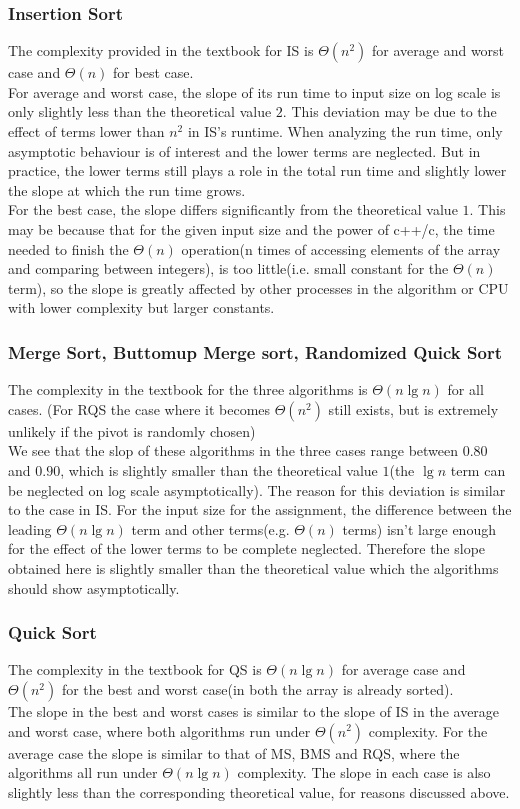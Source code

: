\documentclass[11pt]{article}
\theoremstyle{definition}
\begin{document}
\subsubsection*{Insertion Sort}
The complexity provided in the textbook for IS is $\Theta(n^2)$ for average and worst case and $\Theta(n)$ for best case. \\ 
For average and worst case, the slope of its run time to input size on log scale is only slightly less than the theoretical value $2$. This deviation may be due to the effect of terms lower than $n^2$ in IS's runtime. When analyzing the run time, only asymptotic behaviour is of interest and the lower terms are neglected. But in practice, the lower terms still plays a role in the total run time and slightly lower the slope at which the run time grows. \\ 
For the best case, the slope differs significantly from the theoretical value $1$. This may be because that for the given input size and the power of c++/c, the time needed to finish the $\Theta(n)$ operation(n times of accessing elements of the array and comparing between integers), is too little(i.e. small constant for the $\Theta(n)$ term), so the slope is greatly affected by other processes in the algorithm or CPU with lower complexity but larger constants.
\subsubsection*{Merge Sort, Buttomup Merge sort, Randomized Quick Sort}
The complexity in the textbook for the three algorithms is $\Theta(n\lg{n})$ for all cases. (For RQS the case where it becomes $\Theta(n^2)$ still exists, but is extremely unlikely if the pivot is randomly chosen) \\
We see that the slop of these algorithms in the three cases range between $0.80$ and $0.90$, which is slightly smaller than the theoretical value $1$(the $\lg{n}$ term can be neglected on log scale asymptotically). The reason for this deviation is similar to the case in IS. For the input size for the assignment, the difference between the leading $\Theta(n\lg{n})$ term and other terms(e.g. $\Theta(n)$ terms) isn't large enough for the effect of the lower terms to be complete neglected. Therefore the slope obtained here is slightly smaller than the theoretical value which the algorithms should show asymptotically.
\subsubsection*{Quick Sort}
The complexity in the textbook for QS is $\Theta(n\lg{n})$ for average case and $\Theta(n^2)$ for the best and worst case(in both the array is already sorted). \\ 
The slope in the best and worst cases is similar to the slope of IS in the average and worst case, where both algorithms run under $\Theta(n^2)$ complexity. For the average case the slope is similar to that of MS, BMS and RQS, where the algorithms all run under $\Theta(n\lg{n})$ complexity. The slope in each case is also slightly less than the corresponding theoretical value, for reasons discussed above.
\end{document}
